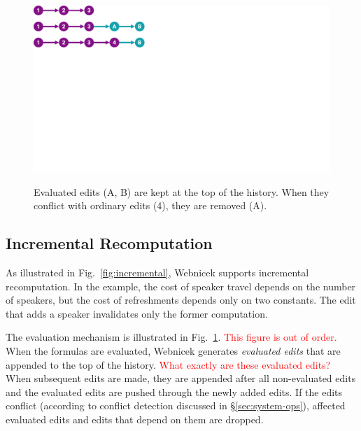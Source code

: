 \documentclass[sigconf,anonymous,screen]{acmart}
\newcommand{\note}[1]{\textcolor{red}{#1}}
\begin{document}
\begin{figure}[t]
\centering
\vspace{-0.5em}
\begin{minipage}{0.55\columnwidth}
  ~\\[1em]
  \includegraphics[width=0.9\columnwidth,clip,trim=0cm 14cm 21cm 0cm]{fig/eval.pdf}
  \end{minipage}%
  \begin{minipage}{0.45\columnwidth}
    \caption{Evaluated edits (A, B) are kept at the top of the history. When they conflict with
    ordinary edits (4), they are removed (A).}
    \label{fig:eval}
  \end{minipage}
  \vspace{-1em}
\end{figure}


\subsection{Incremental Recomputation}
\label{sec:impl-incremental}

As illustrated in Fig.~\ref{fig:incremental}, Webnicek supports incremental recomputation.
In the example, the cost of speaker travel depends on the number of speakers, but the cost
of refreshments depends only on two constants. The edit that adds a speaker invalidates only the former computation.

The evaluation mechanism is illustrated in Fig.~\ref{fig:eval}. \note{This figure is out of order.} When the formulas are evaluated,
Webnicek generates \emph{evaluated edits} that are appended to the top of the history.
\note{What exactly are these evaluated edits?}
When subsequent edits are made, they are appended after all non-evaluated edits and the
evaluated edits are pushed through the newly added edits. If the edits conflict (according to
conflict detection discussed in \S\ref{sec:system-ops}), affected evaluated edits and edits that
depend on them are dropped.
\end{document}
